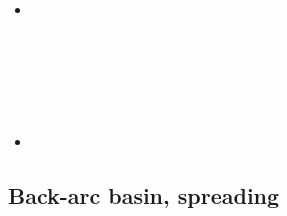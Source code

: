 \begin{scriptsize}
\begin{itemize}
\item[\twothousandtwentyone] 
\textcite{hafw21} \\
\textcite{mabh21} \\
\textcite{mota21} \\ 
\textcite{frbi21} \\ 
\textcite{siht21} \\ 
\textcite{defp21} \\ 
\item[\twothousandtwentytwo] 
\textcite{kewa22} \\ 
\end{itemize}
\end{scriptsize}

\subsection{Back-arc basin, spreading}

